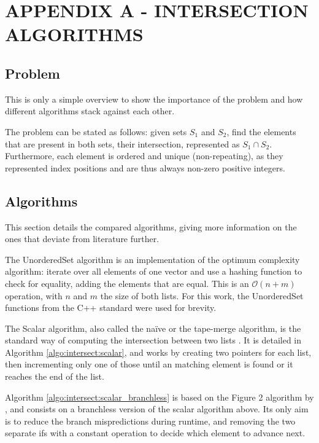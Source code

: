 
\hypertarget{appendix:a}{} %
\renewcommand{\thechapter}{}%
\chapter{APPENDIX A - INTERSECTION ALGORITHMS}
\label{ap:a}
\renewcommand{\thechapter}{A}

\section{Problem}\label{ap:a:problem}

This is only a simple overview to show the importance of the problem and how different algorithms stack against each other.

The problem can be stated as follows: given sets $S_1$ and $S_2$, find the elements that are present in both sets, their intersection, represented as $S_1 \cap S_2$.
Furthermore, each element is ordered and unique (non-repeating), as they represented index positions and are thus always non-zero positive integers.

\section{Algorithms}\label{ap:a:algos}

This section details the compared algorithms, giving more information on the ones that deviate from literature further.

The UnorderedSet algorithm is an implementation of the optimum complexity algorithm: iterate over all elements of one vector and use a hashing function to check for equality, adding the elements that are equal.
This is an $\mathcal{O}(n+m)$ operation, with $n$ and $m$ the size of both lists.
For this work, the UnorderedSet functions from the C++ standard were used for brevity.

The Scalar algorithm, also called the naïve or the tape-merge algorithm, is the standard way of computing the intersection between two lists \cite{hwangSimpleAlgorithmMerging1972}.
It is detailed in Algorithm \ref{algo:intersect:scalar}, and works by creating two pointers for each list, then incrementing only one of those until an matching element is found or it reaches the end of the list.

Algorithm \ref{algo:intersect:scalar_branchless} is based on the Figure 2 algorithm by , and consists on a branchless version of the scalar algorithm above.
Its only aim is to reduce the branch mispredictions during runtime, and removing the two separate ifs with a constant operation to decide which element to advance next.

